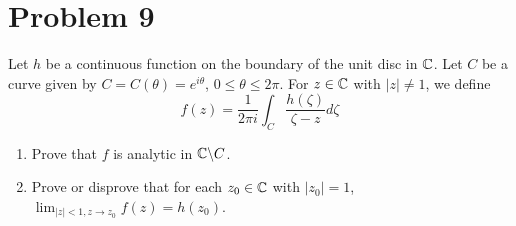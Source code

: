 \section*{Problem 9}

Let \(h\) be a continuous function on the boundary of the unit disc in \(\mathbb{C}\).
Let \(C\) be a curve given by \(C = C(\theta) = e^{i\theta}\),
\(0 \le \theta \le 2\pi\).
For \(z \in \mathbb{C}\) with \(|z| \neq 1\), we define
\[
f(z) = \frac{1}{2\pi i} \int_{C} \frac{h(\zeta)}{\zeta - z} d\zeta
\]
\begin{enumerate}[label=(\arabic*)]
\item Prove that \(f\) is analytic in \(\bbC \bs C\).
\item Prove or disprove that for each \(z_0 \in \mathbb{C}\) with \(|z_0| = 1\),
  \(\lim_{|z| < 1, z \to z_0} f(z) = h(z_0)\).
\end{enumerate}

